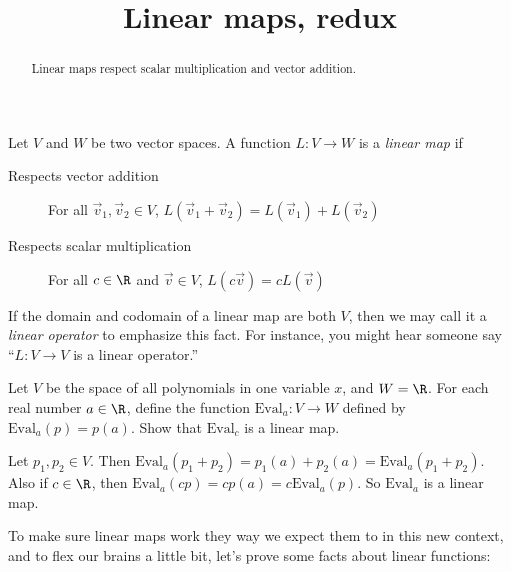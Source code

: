 \documentclass{ximera}
\title{Linear maps, redux}
\begin{document}
\begin{abstract}
  Linear maps respect scalar multiplication and vector addition.
\end{abstract}

\begin{definition}
  Let $V$ and $W$ be two vector spaces.  A function $L: V \to W$ is a \textit{linear map} if 
  \begin{description}
  \item[Respects vector addition] For all $\vec{v}_1,\vec{v}_2 \in V$, $L(\vec{v}_1+\vec{v}_2) = L(\vec{v}_1)+L(\vec{v}_2)$
  \item[Respects scalar multiplication] For all $c \in \R$ and $\vec{v} \in V$, $L(c\vec{v}) = cL(\vec{v})$
  \end{description}
\end{definition}

If the domain and codomain of a linear map are both $V$, then we may
call it a \textit{linear operator} to emphasize this fact.  For
instance, you might hear someone say ``$L : V \to V$ is a linear
operator.''

Let $V$ be the space of all polynomials in one variable $x$, and $W =
\R$.  For each real number $a \in \R$, define the function $\text{Eval}_a: V
\to W$ defined by $\text{Eval}_a(p) = p(a)$.  Show that $\text{Eval}_c$ is a linear
map.

\begin{free-response}	
  Let $p_1, p_2 \in V$.  Then $\text{Eval}_a(p_1+p_2)  = p_1(a)+p_2(a) = \text{Eval}_a(p_1+p_2)$.  Also if $c \in \R$, then $\text{Eval}_a(cp) = cp(a) = c\text{Eval}_a(p)$.  So $\text{Eval}_a$
  is a linear map.
\end{free-response}




To make sure linear maps work they way we expect them to in this new context, and to flex our brains a little bit, let's prove some facts about linear functions:
\end{document}
